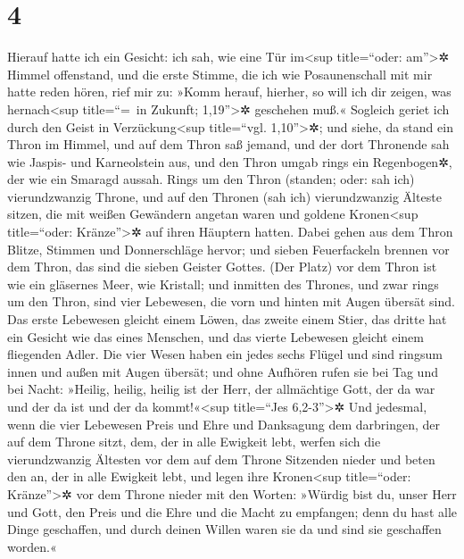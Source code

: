 \hypertarget{section-3}{%
\section{4}\label{section-3}}

 Hierauf hatte ich ein Gesicht: ich sah, wie eine Tür
im\textless sup title=``oder: am''\textgreater✲ Himmel offenstand, und
die erste Stimme, die ich wie Posaunenschall mit mir hatte reden hören,
rief mir zu: »Komm herauf, hierher, so will ich dir zeigen, was
hernach\textless sup title=``=~in Zukunft; 1,19''\textgreater✲ geschehen
muß.« Sogleich geriet ich durch den Geist in Verzückung\textless sup
title=``vgl. 1,10''\textgreater✲;  und siehe, da stand ein
Thron im Himmel, und auf dem Thron saß jemand,  und der
dort Thronende sah wie Jaspis- und Karneolstein aus, und den Thron umgab
rings ein Regenbogen✲, der wie ein Smaragd aussah.  Rings
um den Thron (standen; oder: sah ich) vierundzwanzig Throne, und auf den
Thronen (sah ich) vierundzwanzig Älteste sitzen, die mit weißen
Gewändern angetan waren und goldene Kronen\textless sup title=``oder:
Kränze''\textgreater✲ auf ihren Häuptern hatten.  Dabei
gehen aus dem Thron Blitze, Stimmen und Donnerschläge hervor; und sieben
Feuerfackeln brennen vor dem Thron, das sind die sieben Geister Gottes.
 (Der Platz) vor dem Thron ist wie ein gläsernes Meer, wie
Kristall; und inmitten des Thrones, und zwar rings um den Thron, sind
vier Lebewesen, die vorn und hinten mit Augen übersät sind.
 Das erste Lebewesen gleicht einem Löwen, das zweite einem
Stier, das dritte hat ein Gesicht wie das eines Menschen, und das vierte
Lebewesen gleicht einem fliegenden Adler.  Die vier Wesen
haben ein jedes sechs Flügel und sind ringsum innen und außen mit Augen
übersät; und ohne Aufhören rufen sie bei Tag und bei Nacht: »Heilig,
heilig, heilig ist der Herr, der allmächtige Gott, der da war und der da
ist und der da kommt!«\textless sup title=``Jes 6,2-3''\textgreater✲
 Und jedesmal, wenn die vier Lebewesen Preis und Ehre und
Danksagung dem darbringen, der auf dem Throne sitzt, dem, der in alle
Ewigkeit lebt,  werfen sich die vierundzwanzig Ältesten
vor dem auf dem Throne Sitzenden nieder und beten den an, der in alle
Ewigkeit lebt, und legen ihre Kronen\textless sup title=``oder:
Kränze''\textgreater✲ vor dem Throne nieder mit den Worten:
 »Würdig bist du, unser Herr und Gott, den Preis und die
Ehre und die Macht zu empfangen; denn du hast alle Dinge geschaffen, und
durch deinen Willen waren sie da und sind sie geschaffen worden.«

